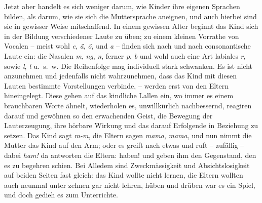 \label{fp.66}

Jetzt aber handelt es sich weniger darum, wie Kinder ihre eigenen Sprachen bilden, als darum, wie sie sich die Muttersprache aneignen, und auch hierbei sind sie in gewisser Weise mitschaffend. In einem gewissen Alter beginnt das Kind sich in der Bildung verschiedener Laute zu üben; zu einem kleinen Vorrathe von Vocalen – meist wohl \textit{e}, \textit{ä}, \textit{ö}, \textit{} und \textit{a} – finden sich nach und nach consonantische Laute ein: die Nasalen \textit{m}, \textit{ng}, \textit{n}, ferner \textit{p}, \textit{b} und wohl auch eine Art labiales \textit{r}, sowie \textit{l}, \textit{t} u.~s.~w. Die Reihenfolge mag individuell stark schwanken. Es ist nicht anzunehmen und jedenfalls nicht wahrzunehmen, dass das Kind mit diesen Lauten bestimmte Vorstellungen verbinde, –  werden erst von den Eltern hineingelegt. Diese gehen auf das kindliche Lallen ein, wo immer es einem brauchbaren Worte ähnelt, wiederholen es, unwillkürlich nachbessernd, reagiren darauf und gewöhnen so den erwachenden Geist, die \label{sp.66} Bewegung der Lauterzeugung, ihre hörbare Wirkung und das darauf Erfolgende  in Beziehung zu setzen. Das Kind sagt \textit{m-m}, die Eltern sagen \textit{mama}, \textit{mama}, und nun nimmt die Mutter das Kind auf den Arm; oder es greift nach etwas und ruft – zufällig – dabei \textit{ham!} da antworten die Eltern: haben! und geben ihm den Gegenstand, den es zu begehren schien. Bei Alledem sind Zweckmässigkeit und Absichtslosigkeit auf beiden Seiten fast gleich: das Kind wollte nicht lernen, die Eltern wollten auch neunmal unter zehnen gar nicht lehren, hüben und drüben war es ein Spiel, und doch gedieh es zum Unterrichte.

